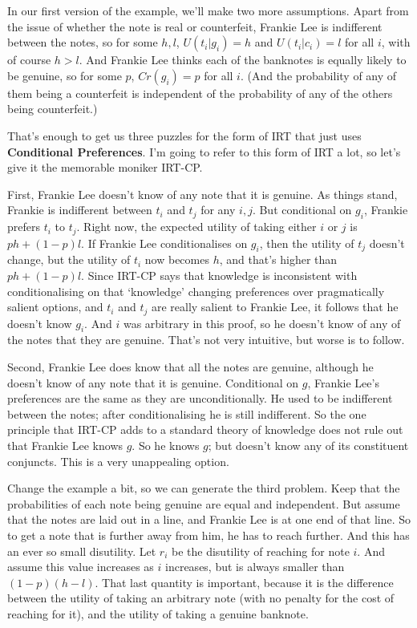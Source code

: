 \documentclass[11pt,]{book}
\begin{document}
In our first version of the example, we'll make two more assumptions. Apart from the issue of whether the note is real or counterfeit, Frankie Lee is indifferent between the notes, so for some \(h, l\), \(U(t_i | g_i) = h\) and \(U(t_i | c_i) = l\) for all \(i\), with of course \(h > l\). And Frankie Lee thinks each of the banknotes is equally likely to be genuine, so for some \(p\), \(Cr(g_i) = p\) for all \(i\). (And the probability of any of them being a counterfeit is independent of the probability of any of the others being counterfeit.)

That's enough to get us three puzzles for the form of IRT that just uses \textbf{Conditional Preferences}. I'm going to refer to this form of IRT a lot, so let's give it the memorable moniker IRT-CP.

First, Frankie Lee doesn't know of any note that it is genuine. As things stand, Frankie is indifferent between \(t_i\) and \(t_j\) for any \(i, j\). But conditional on \(g_i\), Frankie prefers \(t_i\) to \(t_j\). Right now, the expected utility of taking either \(i\) or \(j\) is \(ph + (1-p)l\). If Frankie Lee conditionalises on \(g_i\), then the utility of \(t_j\) doesn't change, but the utility of \(t_i\) now becomes \(h\), and that's higher than \(ph + (1-p)l\). Since IRT-CP says that knowledge is inconsistent with conditionalising on that `knowledge' changing preferences over pragmatically salient options, and \(t_i\) and \(t_j\) are really salient to Frankie Lee, it follows that he doesn't know \(g_i\). And \(i\) was arbitrary in this proof, so he doesn't know of any of the notes that they are genuine. That's not very intuitive, but worse is to follow.

Second, Frankie Lee does know that all the notes are genuine, although he doesn't know of any note that it is genuine. Conditional on \(g\), Frankie Lee's preferences are the same as they are unconditionally. He used to be indifferent between the notes; after conditionalising he is still indifferent. So the one principle that IRT-CP adds to a standard theory of knowledge does not rule out that Frankie Lee knows \(g\). So he knows \(g\); but doesn't know any of its constituent conjuncts. This is a very unappealing option.

Change the example a bit, so we can generate the third problem. Keep that the probabilities of each note being genuine are equal and independent. But assume that the notes are laid out in a line, and Frankie Lee is at one end of that line. So to get a note that is further away from him, he has to reach further. And this has an ever so small disutility. Let \(r_i\) be the disutility of reaching for note \(i\). And assume this value increases as \(i\) increases, but is always smaller than \((1-p)(h-l)\). That last quantity is important, because it is the difference between the utility of taking an arbitrary note (with no penalty for the cost of reaching for it), and the utility of taking a genuine banknote.
\end{document}
